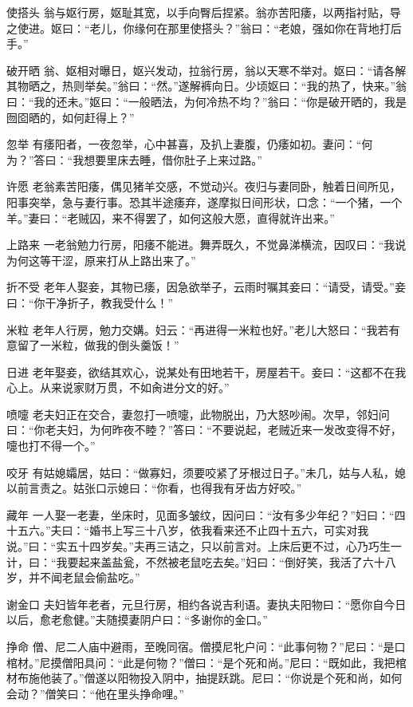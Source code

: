 \documentclass[12pt,UTF8]{ctexbook}
\begin{document}
使搭头
翁与妪行房，妪耻其宽，以手向臀后捏紧。翁亦苦阳痿，以两指衬贴，导之使进。妪曰：“老儿，你缘何在那里使搭头？”翁曰：“老娘，强如你在背地打后手。”

破开晒
翁、妪相对曝日，妪兴发动，拉翁行房，翁以天寒不举对。妪曰：“请各解其物晒之，热则举矣。”翁曰：“然。”遂解裤向日。少顷妪曰：“我的热了，快来。”翁曰：“我的还未。”妪曰：“一般晒法，为何冷热不均？”翁曰：“你是破开晒的，我是囫囵晒的，如何赶得上？”

忽举
有痿阳者，一夜忽举，心中甚喜，及扒上妻腹，仍痿如初。妻问：“何为？”答曰：“我想要里床去睡，借你肚子上来过路。”

许愿
老翁素苦阳痿，偶见猪羊交感，不觉动兴。夜归与妻同卧，触着日间所见，阳事突举，急与妻行事。恐其半途痿弃，遂摩拟日间形状，口念：“一个猪，一个羊。”妻曰：“老贼囚，来不得罢了，如何这般大愿，直得就许出来。”

上路来
一老翁勉力行房，阳痿不能进。舞弄既久，不觉鼻涕横流，因叹曰：“我说为何这等干涩，原来打从上路出来了。”

折不受
老年人娶妾，其物已痿，因急欲举子，云雨时嘱其妾曰：“请受，请受。”妾曰：“你干净折子，教我受什么！”

米粒
老年人行房，勉力交媾。妇云：“再进得一米粒也好。”老儿大怒曰：“我若有意留了一米粒，做我的倒头羹饭！”

日进
老年娶妾，欲结其欢心，说某处有田地若干，房屋若干。妾曰：“这都不在我心上。从来说家财万贯，不如肏进分文的好。”

喷嚏
老夫妇正在交合，妻忽打一喷嚏，此物脱出，乃大怒吵闹。次早，邻妇问曰：“你老夫妇，为何昨夜不睦？”答曰：“不要说起，老贼近来一发改变得不好，嚏也打不得一个。”

咬牙
有姑媳孀居，姑曰：“做寡妇，须要咬紧了牙根过日子。”未几，姑与人私，媳以前言责之。姑张口示媳曰：“你看，也得我有牙齿方好咬。”

藏年
一人娶一老妻，坐床时，见面多皱纹，因问曰：“汝有多少年纪？”妇曰：“四十五六。”夫曰：“婚书上写三十八岁，依我看来还不止四十五六，可实对我说。”曰：“实五十四岁矣。”夫再三诘之，只以前言对。上床后更不过，心乃巧生一计，曰：“我要起来盖盐瓮，不然被老鼠吃去矣。”妇曰：“倒好笑，我活了六十八岁，并不闻老鼠会偷盐吃。”

谢金口
夫妇皆年老者，元旦行房，相约各说吉利语。妻执夫阳物曰：“愿你自今日以后，愈老愈健。”夫随摸妻阴户曰：“多谢你的金口。”

挣命
僧、尼二人庙中避雨，至晚同宿。僧摸尼牝户问：“此事何物？”尼曰：“是口棺材。”尼摸僧阳具问：“此是何物？”僧曰：“是个死和尚。”尼曰：“既如此，我把棺材布施他装了。”僧遂以阳物投入阴中，抽提跃跳。尼曰：“你说是个死和尚，如何会动？”僧笑曰：“他在里头挣命哩。”
\end{document}
